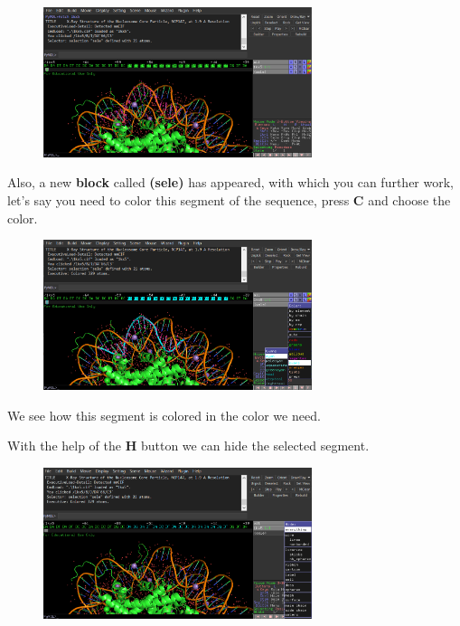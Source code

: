 \documentclass{article}
\begin{document}
\begin{figure}[h!]
    \centering
    \includegraphics[width=0.7\textwidth]{workshops/pymol/imgs/sequencesele.png}
    \caption[]{}
    \label{sequencesele}
\end{figure}

Also, a new \textbf{block} called \textbf{(sele)} has appeared, with which you can further work, let's say you need to color this segment of the sequence, press {\Large \textbf{C}}
and choose the color. \\

\begin{figure}[h!]
    \centering
    \includegraphics[width=0.7\textwidth]{workshops/pymol/imgs/sequenceseleclr.png}
    \caption[]{}
    \label{sequenceseleclr}
\end{figure}

We see how this segment is colored in the color we need.

With the help of the {\Large \textbf{H}} button we can hide the selected segment. \\

\begin{figure}[h!]
    \centering
    \includegraphics[width=0.7\textwidth]{workshops/pymol/imgs/hiddensequence.png}
    \caption[]{}
    \label{hiddensequence}
\end{figure}
\end{document}
